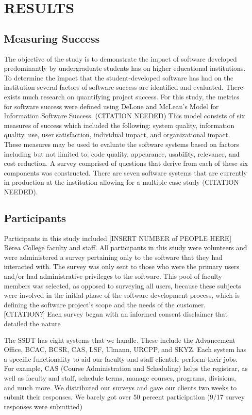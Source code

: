 
\section{RESULTS}
\subsection{Measuring Success}
The objective of the study is to demonstrate the impact of software developed predominantly by undergraduate students has on higher educational institutions. To determine the impact that the student-developed software has had on the institution several factors of software success are identified and evaluated.  There exists much research on quantifying project success. For this study, the metrics for software success were defined using DeLone and McLean’s Model for Information Software Success. (CITATION NEEDED) This model consists of six measures of success which included the following: system quality, information quality, use, user satisfaction, individual impact, and organizational impact. These measures may be used to evaluate the software systems based on factors including but not limited to, code quality, appearance, usability, relevance, and cost reduction.  A survey comprised of questions that derive from each of these six components was constructed. There are seven software systems that are currently in production at the institution allowing for a multiple case study (CITATION NEEDED).

\subsection{Participants}
Participants in this study included [INSERT NUMBER of PEOPLE HERE] Berea College faculty and staff. All participants in this study were volunteers and were administered a survey pertaining only to the software that they had interacted with. The survey was only sent to those who were the primary users and/or had administrative privileges to the software. This pool of faculty members was selected, as opposed to surveying all users, because these subjects were involved in the initial phase of the software development process, which is defining the software project’s scope and the needs of the customer. [CITATION?] Each survey began with an informed consent disclaimer that detailed the nature

The SSDT has eight systems that we handle. These include the Advancement Office, BCAC, BCSR, CAS, LSF, Ulmann, URCPP, and SKYZ. Each system has a specific functionality to aid our faculty and staff clientele perform their jobs. For example, CAS (Course Administration and Scheduling) helps the registrar, as well as faculty and staff, schedule terms, manage courses, programs, divisions, and much more.
We distributed our surveys and gave our clients two weeks to submit their responses. We barely got over 50 percent participation (9/17 survey responses were submitted)


